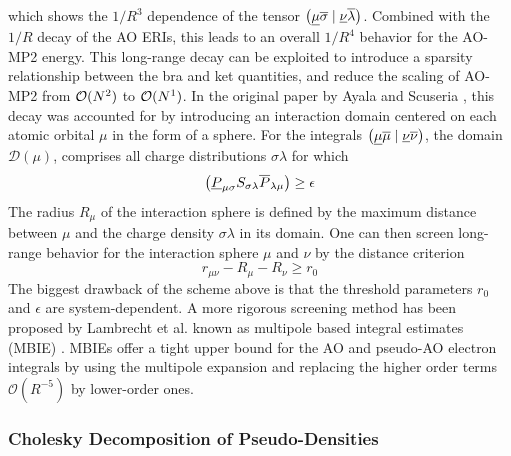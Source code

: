 \noindent which shows the $1/R^3$ dependence of the tensor $\left( \underline{\mu}\overline{\sigma} \mid \underline{\nu}\overline{\lambda} \right)$. Combined with the $1/R$ decay of the AO ERIs, this leads to an overall $1/R^4$ behavior for the AO-MP2 energy. This long-range decay can be exploited to introduce a sparsity relationship between the bra and ket quantities, and reduce the scaling of AO-MP2 from $\mathcal{O}(N^{2})$ to $\mathcal{O}(N^{1})$. In the original paper by Ayala and Scuseria \cite{Aya1999}, this decay was accounted for by introducing an interaction domain centered on each atomic orbital $\mu$ in the form of a sphere. For the integrals $\left( \underline{\mu}\overline{\mu} \mid \underline{\nu}\overline{\nu} \right)$, the domain $\mathcal{D}(\mu)$, comprises all charge distributions $\sigma\lambda$ for which 
\begin{equation}
\left( \underline{P}_{\mu\sigma} S_{\sigma\lambda} \overline{P}_{\lambda\mu} \right) \geq \epsilon 
\end{equation}
\noindent The radius $R_{\mu}$ of the interaction sphere is defined by the maximum distance between $\mu$ and the charge density $\sigma\lambda$ in its domain. One can then screen long-range behavior for the interaction sphere $\mu$ and $\nu$ by the distance criterion
\begin{equation}
r_{\mu\nu} - R_{\mu} - R_{\nu} \geq r_0
\end{equation}
\noindent The biggest drawback of the scheme above is that the threshold parameters $r_0$ and $\epsilon$ are system-dependent. 
A more rigorous screening method has been proposed by Lambrecht et al. known as multipole based integral estimates (MBIE) \cite{Lam2005,Lam2005a,Dos2008}. MBIEs offer a tight upper bound for the AO and pseudo-AO electron integrals by using the multipole expansion and replacing the higher order terms $\mathcal{O}(R^{-5})$ by lower-order ones. 


\subsubsection{Cholesky Decomposition of Pseudo-Densities}

